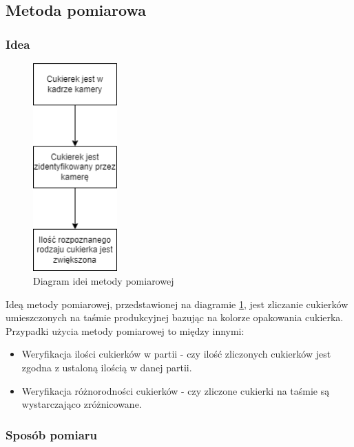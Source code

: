 \documentclass{article}
\begin{document}
\subsection{Metoda pomiarowa}
\label{Metoda pomiarowa}
\subsubsection{Idea}
\label{Idea}

\begin{figure}[H]
    \centering
    \includegraphics[height=8cm]{diagramIdei.png}
    \caption{Diagram idei metody pomiarowej}
    \label{fig:diagramIdei}
\end{figure}

Ideą metody pomiarowej, przedstawionej na diagramie \ref{fig:diagramIdei}, jest zliczanie cukierków umieszczonych na taśmie produkcyjnej bazując na kolorze opakowania cukierka. Przypadki użycia metody pomiarowej to między innymi:

\begin{itemize}
    \item Weryfikacja ilości cukierków w partii - czy ilość zliczonych cukierków jest zgodna z ustaloną ilością w danej partii.
    \item Weryfikacja różnorodności cukierków - czy zliczone cukierki na taśmie są wystarczająco zróżnicowane.
\end{itemize}

\subsubsection{Sposób pomiaru}
\label{Sposób pomiaru}
\end{document}
